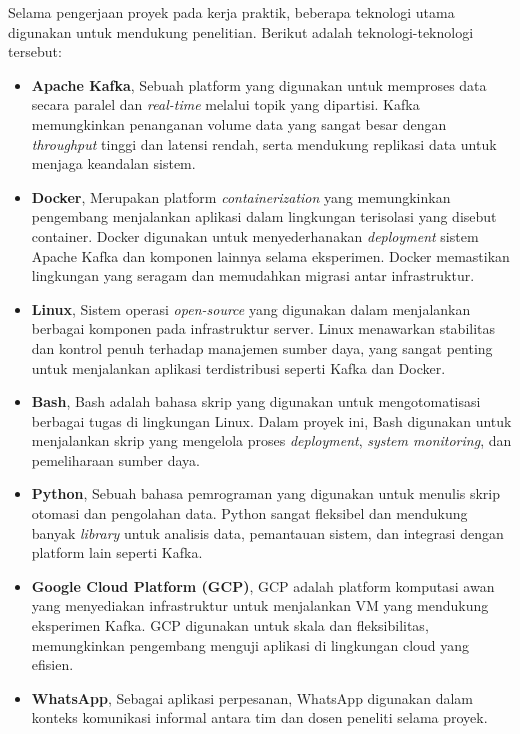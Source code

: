 Selama pengerjaan proyek pada kerja praktik, beberapa teknologi utama digunakan untuk mendukung penelitian. Berikut adalah teknologi-teknologi tersebut:

\begin{itemize}

	\item \textbf{Apache Kafka}, Sebuah platform yang digunakan untuk memproses data secara paralel dan \textit{real-time} melalui topik yang dipartisi. Kafka memungkinkan penanganan volume data yang sangat besar dengan \textit{throughput} tinggi dan latensi rendah, serta mendukung replikasi data untuk menjaga keandalan sistem.

	\item \textbf{Docker}, Merupakan platform \textit{containerization} yang memungkinkan pengembang menjalankan aplikasi dalam lingkungan terisolasi yang disebut container. Docker digunakan untuk menyederhanakan \textit{deployment} sistem Apache Kafka dan komponen lainnya selama eksperimen. Docker memastikan lingkungan yang seragam dan memudahkan migrasi antar infrastruktur.

	\item \textbf{Linux}, Sistem operasi \textit{open-source} yang digunakan dalam menjalankan berbagai komponen pada infrastruktur server. Linux menawarkan stabilitas dan kontrol penuh terhadap manajemen sumber daya, yang sangat penting untuk menjalankan aplikasi terdistribusi seperti Kafka dan Docker.

	\item \textbf{Bash}, Bash adalah bahasa skrip yang digunakan untuk mengotomatisasi berbagai tugas di lingkungan Linux. Dalam proyek ini, Bash digunakan untuk menjalankan skrip yang mengelola proses \textit{deployment}, \textit{system monitoring}, dan pemeliharaan sumber daya.

	\item \textbf{Python}, Sebuah bahasa pemrograman yang digunakan untuk menulis skrip otomasi dan pengolahan data. Python sangat fleksibel dan mendukung banyak \textit{library} untuk analisis data, pemantauan sistem, dan integrasi dengan platform lain seperti Kafka.

	\item \textbf{Google Cloud Platform (GCP)}, GCP adalah platform komputasi awan yang menyediakan infrastruktur untuk menjalankan VM yang mendukung eksperimen Kafka. GCP digunakan untuk skala dan fleksibilitas, memungkinkan pengembang menguji aplikasi di lingkungan cloud yang efisien.

	\item \textbf{WhatsApp}, Sebagai aplikasi perpesanan, WhatsApp digunakan dalam konteks komunikasi informal antara tim dan dosen peneliti selama proyek.

\end{itemize}

